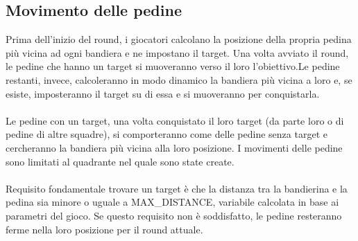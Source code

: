 \documentclass{article}
\begin{document}
\subsection{Movimento delle pedine}
Prima dell'inizio del round, i giocatori calcolano la posizione della propria pedina più vicina ad ogni bandiera e ne impostano il target. \newline Una volta avviato il round, le pedine che hanno un target si muoveranno verso il loro l'obiettivo.\newline Le pedine restanti, invece, calcoleranno in modo dinamico la bandiera più vicina a loro e, se esiste, imposteranno il target su di essa e si muoveranno per conquistarla.
\\\\ Le pedine con un target, una volta conquistato il loro target (da parte loro o di pedine di altre squadre), si comporteranno come delle pedine senza target e cercheranno la bandiera più vicina alla loro posizione.\newline
I movimenti delle pedine sono limitati al quadrante nel quale sono state create. \\\\
Requisito fondamentale trovare un target è che la distanza tra la bandierina e la pedina sia minore o uguale a MAX\_DISTANCE, variabile calcolata in base ai parametri del gioco. Se questo requisito non è soddisfatto, le pedine resteranno ferme nella loro posizione per il round attuale.
\end{document}
